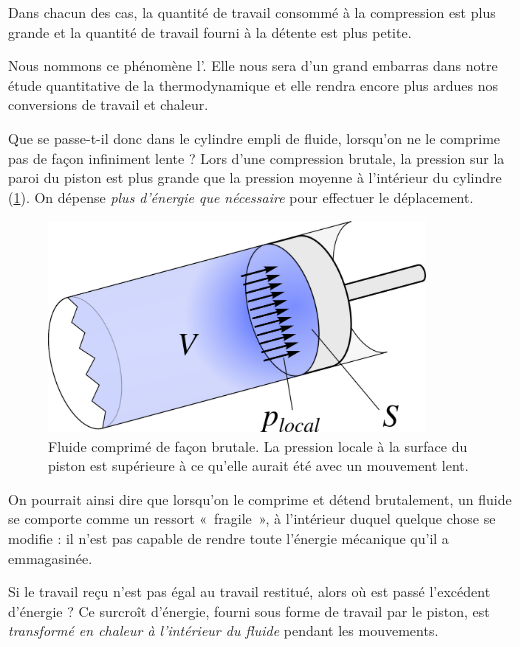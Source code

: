 		Dans chacun des cas, la quantité de travail consommé à la compression est plus grande et la quantité de travail fourni à la détente est plus petite.
		
		Nous nommons ce phénomène l’. Elle nous sera d’un grand embarras dans notre étude quantitative de la thermodynamique et elle rendra encore plus ardues nos conversions de travail et chaleur.

		Que se passe-t-il donc dans le cylindre empli de fluide, lorsqu’on ne le comprime pas de façon infiniment lente ? Lors d’une compression brutale, la pression sur la paroi du piston est plus grande que la pression moyenne à l’intérieur du cylindre (\cref{fig_piston_fluide_rapide}). On dépense \emph{plus d’énergie que nécessaire} pour effectuer le déplacement.

		\begin{figure}
			\begin{center}
				\includegraphics[width=10cm]{images/travail_cylindre_3.png}
			\end{center}
			\caption{Fluide comprimé de façon brutale. La pression locale à la surface du piston est supérieure à ce qu’elle aurait été avec un mouvement lent.}
			\label{fig_piston_fluide_rapide}
		\end{figure}

		On pourrait ainsi dire que lorsqu’on le comprime et détend brutalement, un fluide se comporte comme un ressort «~fragile~», à l’intérieur duquel quelque chose se modifie : il n’est pas capable de rendre toute l’énergie mécanique qu’il a emmagasinée.

		Si le travail reçu n’est pas égal au travail restitué, alors où est passé l’excédent d’énergie ? Ce surcroît d’énergie, fourni sous forme de travail par le piston, est \emph{transformé en chaleur à l’intérieur du fluide} pendant les mouvements. 

		\clearfloats %

